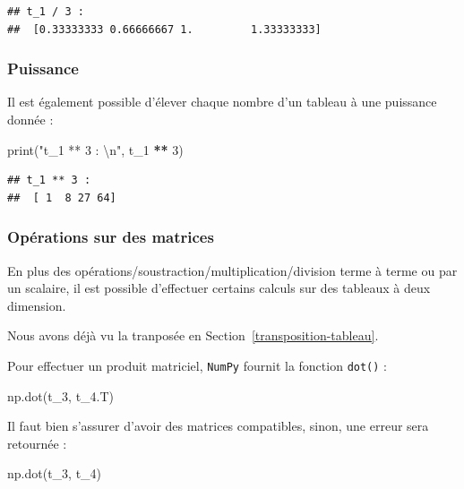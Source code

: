 \documentclass[12pt,]{book}
\newenvironment{Shaded}{\begin{snugshade}}{\end{snugshade}}
\newcommand{\DecValTok}[1]{\textcolor[rgb]{0.00,0.00,0.81}{#1}}
\newcommand{\CharTok}[1]{\textcolor[rgb]{0.31,0.60,0.02}{#1}}
\newcommand{\StringTok}[1]{\textcolor[rgb]{0.31,0.60,0.02}{#1}}
\newcommand{\OperatorTok}[1]{\textcolor[rgb]{0.81,0.36,0.00}{\textbf{#1}}}
\newcommand{\BuiltInTok}[1]{#1}
\newcommand{\NormalTok}[1]{#1}
\numberwithin{equation}{section}
\numberwithin{countremarque}{section}
\begin{document}
\begin{lstlisting}
## t_1 / 3 : 
##  [0.33333333 0.66666667 1.         1.33333333]
\end{lstlisting}

\subsubsection{Puissance}\label{puissance-1}

Il est également possible d'élever chaque nombre d'un tableau à une
puissance donnée :

\begin{Shaded}
\begin{Highlighting}[]
\BuiltInTok{print}\NormalTok{(}\StringTok{"t_1 ** 3 : }\CharTok{\textbackslash{}n}\StringTok{"}\NormalTok{, t_1 }\OperatorTok{**} \DecValTok{3}\NormalTok{)}
\end{Highlighting}
\end{Shaded}

\begin{lstlisting}
## t_1 ** 3 : 
##  [ 1  8 27 64]
\end{lstlisting}

\subsubsection{Opérations sur des
matrices}\label{operations-sur-des-matrices}

En plus des opérations/soustraction/multiplication/division terme à
terme ou par un scalaire, il est possible d'effectuer certains calculs
sur des tableaux à deux dimension.

Nous avons déjà vu la tranposée en Section~\ref{transposition-tableau}.

Pour effectuer un produit matriciel, \texttt{NumPy} fournit la fonction
\texttt{dot()} :

\begin{Shaded}
\begin{Highlighting}[]
\NormalTok{np.dot(t_3, t_4.T)}
\end{Highlighting}
\end{Shaded}

Il faut bien s'assurer d'avoir des matrices compatibles, sinon, une
erreur sera retournée :

\begin{Shaded}
\begin{Highlighting}[]
\NormalTok{np.dot(t_3, t_4)}
\end{Highlighting}
\end{Shaded}
\end{document}

